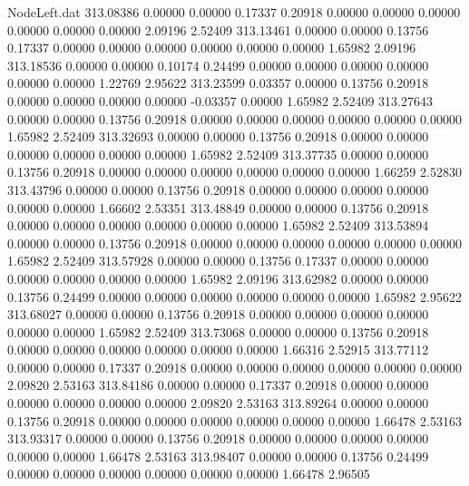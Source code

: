 \begin{filecontents}{NodeLeft.dat}
 313.08386    0.00000    0.00000     0.17337    0.20918    0.00000    0.00000    0.00000    0.00000    0.00000    0.00000    2.09196    2.52409
 313.13461    0.00000    0.00000     0.13756    0.17337    0.00000    0.00000    0.00000    0.00000    0.00000    0.00000    1.65982    2.09196
 313.18536    0.00000    0.00000     0.10174    0.24499    0.00000    0.00000    0.00000    0.00000    0.00000    0.00000    1.22769    2.95622
 313.23599    0.03357    0.00000     0.13756    0.20918    0.00000    0.00000    0.00000    0.00000   -0.03357    0.00000    1.65982    2.52409
 313.27643    0.00000    0.00000     0.13756    0.20918    0.00000    0.00000    0.00000    0.00000    0.00000    0.00000    1.65982    2.52409
 313.32693    0.00000    0.00000     0.13756    0.20918    0.00000    0.00000    0.00000    0.00000    0.00000    0.00000    1.65982    2.52409
 313.37735    0.00000    0.00000     0.13756    0.20918    0.00000    0.00000    0.00000    0.00000    0.00000    0.00000    1.66259    2.52830
 313.43796    0.00000    0.00000     0.13756    0.20918    0.00000    0.00000    0.00000    0.00000    0.00000    0.00000    1.66602    2.53351
 313.48849    0.00000    0.00000     0.13756    0.20918    0.00000    0.00000    0.00000    0.00000    0.00000    0.00000    1.65982    2.52409
 313.53894    0.00000    0.00000     0.13756    0.20918    0.00000    0.00000    0.00000    0.00000    0.00000    0.00000    1.65982    2.52409
 313.57928    0.00000    0.00000     0.13756    0.17337    0.00000    0.00000    0.00000    0.00000    0.00000    0.00000    1.65982    2.09196
 313.62982    0.00000    0.00000     0.13756    0.24499    0.00000    0.00000    0.00000    0.00000    0.00000    0.00000    1.65982    2.95622
 313.68027    0.00000    0.00000     0.13756    0.20918    0.00000    0.00000    0.00000    0.00000    0.00000    0.00000    1.65982    2.52409
 313.73068    0.00000    0.00000     0.13756    0.20918    0.00000    0.00000    0.00000    0.00000    0.00000    0.00000    1.66316    2.52915
 313.77112    0.00000    0.00000     0.17337    0.20918    0.00000    0.00000    0.00000    0.00000    0.00000    0.00000    2.09820    2.53163
 313.84186    0.00000    0.00000     0.17337    0.20918    0.00000    0.00000    0.00000    0.00000    0.00000    0.00000    2.09820    2.53163
 313.89264    0.00000    0.00000     0.13756    0.20918    0.00000    0.00000    0.00000    0.00000    0.00000    0.00000    1.66478    2.53163
 313.93317    0.00000    0.00000     0.13756    0.20918    0.00000    0.00000    0.00000    0.00000    0.00000    0.00000    1.66478    2.53163
 313.98407    0.00000    0.00000     0.13756    0.24499    0.00000    0.00000    0.00000    0.00000    0.00000    0.00000    1.66478    2.96505

\end{filecontents}
